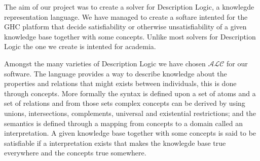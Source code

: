 The aim of our project was to create a solver for Description Logic, a
knowlegde representation language. We have managed to create a softare
intented for the GHC platform that decide satisfiability or otherwise
unsatisfiability of a given knowledge base together with some
concepts. Unlike most solvers for Description Logic the one we
create is intented for academia.

Amongst the many varieties of Description Logic we have chosen
$\mathcal{ALC}$ for our software. The language provides a way to
describe knowledge about the properties and relations that might
exists between individuals, this is done through concepts. More
formally the syntax is defined upon a set of atoms and a set of
relations and from those sets complex concepts can be derived by using
unions, intersections, complements, universal and existential
restrictions; and the semantics is defined through a mapping from
concepts to a domain called an interpretation. A given knowledge base
together with some concepts is said to be satisfiable if a
interpretation exists that makes the knowlegde base true everywhere
and the concepts true somewhere.
